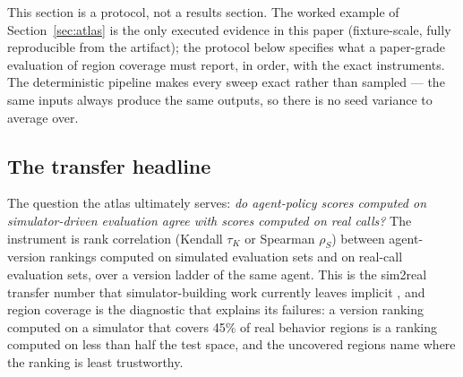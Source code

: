 This section is a protocol, not a results section.
The worked example of Section~\ref{sec:atlas} is the only executed evidence in this paper
(fixture-scale, fully reproducible from the artifact); the protocol below specifies what a
paper-grade evaluation of region coverage must report, in order, with the exact instruments.
The deterministic pipeline makes every sweep exact rather than sampled --- the same inputs
always produce the same outputs, so there is no seed variance to average over.

\subsection{The transfer headline}
The question the atlas ultimately serves: \emph{do agent-policy scores computed on
simulator-driven evaluation agree with scores computed on real calls?}
The instrument is rank correlation (Kendall $\tau_K$ or Spearman $\rho_S$) between agent-version
rankings computed on simulated evaluation sets and on real-call evaluation sets, over a
version ladder of the same agent.
This is the sim2real transfer number that simulator-building work currently leaves implicit
\citep{distributionalGap2026,cue2026,sim2realAgentic2026}, and region coverage is the
diagnostic that explains its failures: a version ranking computed on a simulator that covers
45\% of real behavior regions is a ranking computed on less than half the test space, and the
uncovered regions name where the ranking is least trustworthy.

